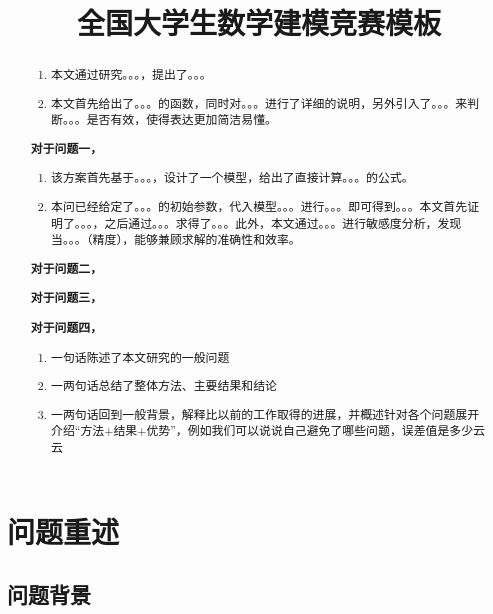 \documentclass[withoutpreface,bwprint]{cumcmthesis}
\title{全国大学生数学建模竞赛模板}
\begin{document}
\maketitle
\thispagestyle{empty}
\begin{abstract}
\begin{enumerate}
    \item  本文通过研究。。。，提出了。。。
    \item  本文首先给出了。。。的函数，同时对。。。进行了详细的说明，另外引入了。。。来判断。。。是否有效，使得表达更加简洁易懂。
\end{enumerate}


\textbf{对于问题一，}
\begin{enumerate}
    \item 该方案首先基于。。。，设计了一个模型，给出了直接计算。。。的公式。
    \item 本问已经给定了。。。的初始参数，代入模型。。。进行。。。即可得到。。。本文首先证明了。。。，之后通过。。。求得了。。。此外，本文通过。。。进行敏感度分析，发现当。。。（精度），能够兼顾求解的准确性和效率。
\end{enumerate}


\textbf{对于问题二，}

\textbf{对于问题三，}

\textbf{对于问题四，}

\begin{enumerate}
    \item 一句话陈述了本文研究的一般问题
    \item 一两句话总结了整体方法、主要结果和结论
    \item 一两句话回到一般背景，解释比以前的工作取得的进展，并概述针对各个问题展开介绍“方法+结果+优势”，例如我们可以说说自己避免了哪些问题，误差值是多少云云
\end{enumerate}


\end{abstract}
\setcounter{page}{1}
\pagestyle{plain}

\section{问题重述}

\subsection{问题背景}
\end{document}
